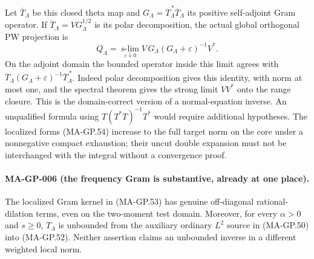 Let $\overline T_\Lambda$ be this closed theta map and
$G_\Lambda=\overline T_\Lambda^{\,*}\overline T_\Lambda$
its positive self-adjoint Gram operator.  If
$\overline T_\Lambda=V G_\Lambda^{1/2}$ is its polar
decomposition, the actual global orthogonal PW projection is
\[
 Q_\Lambda
     =\operatorname*{s-lim}_{\varepsilon\downarrow0}
          V\,G_\Lambda(G_\Lambda+\varepsilon)^{-1}V^*.
 \tag{MA-GP.55}
\]
On the adjoint domain the bounded operator inside this limit
agrees with
$\overline T_\Lambda(G_\Lambda+\varepsilon)^{-1}
\overline T_\Lambda^{\,*}$.
Indeed polar decomposition gives this identity, with norm
at most one, and the spectral theorem gives the strong limit
$VV^*$ onto the range closure.  This is the domain-correct
version of a normal-equation inverse.  An unqualified formula
using $T(T^*T)^{-1}T^*$ would require additional hypotheses.
The localized forms (MA-GP.54) increase to the full target
norm on the core under a nonnegative compact exhaustion;
their uncut double expansion must not be interchanged with
the integral without a convergence proof.

\paragraph{MA-GP-006 (the frequency Gram is substantive, already at one place).}
The localized Gram kernel in (MA-GP.53) has genuine
off-diagonal rational-dilation terms, even on the two-moment
test domain.  Moreover, for every $\alpha>0$ and $s\ge0$,
$T_\Lambda$ is unbounded from the auxiliary ordinary
$L^2$ source in (MA-GP.50) into (MA-GP.52).
Neither assertion claims an unbounded inverse in a different
weighted local norm.

